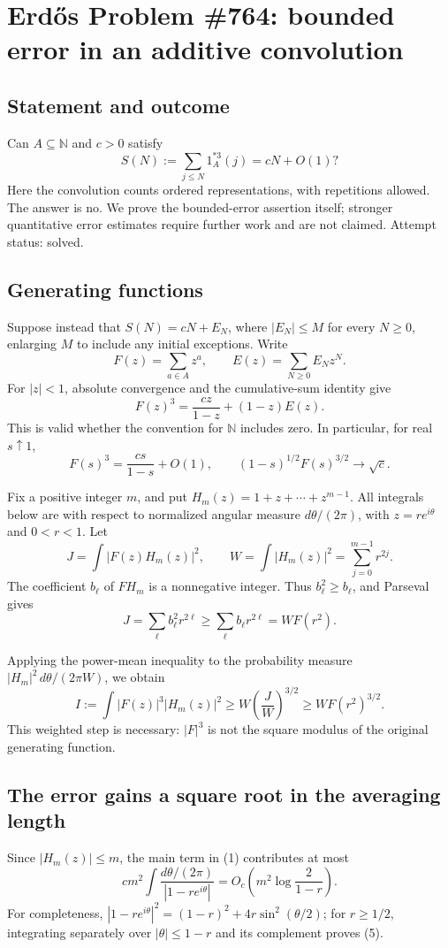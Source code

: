 \section*{Erd\H{o}s Problem \#764: bounded error in an additive convolution}
\subsection*{Statement and outcome}
Can \(A\subseteq\mathbb N\) and \(c>0\) satisfy
\[
S(N):=\sum_{j\leq N}1_A^{*3}(j)=cN+O(1)?
\]
Here the convolution counts ordered representations, with repetitions allowed. The answer is no. We prove the bounded-error assertion itself; stronger quantitative error estimates require further work and are not claimed. Attempt status: solved.

\subsection*{Generating functions}
Suppose instead that \(S(N)=cN+E_N\), where \(|E_N|\leq M\) for every \(N\geq0\), enlarging \(M\) to include any initial exceptions. Write
\[
F(z)=\sum_{a\in A}z^a,\qquad E(z)=\sum_{N\geq0}E_Nz^N.
\]
For \(|z|<1\), absolute convergence and the cumulative-sum identity give
\[
F(z)^3=\frac{cz}{1-z}+(1-z)E(z). \tag{1}
\]
This is valid whether the convention for \(\mathbb N\) includes zero. In particular, for real \(s\uparrow1\),
\[
F(s)^3=\frac{cs}{1-s}+O(1),\qquad
(1-s)^{1/2}F(s)^{3/2}\longrightarrow\sqrt c. \tag{2}
\]

Fix a positive integer \(m\), and put \(H_m(z)=1+z+\cdots+z^{m-1}\). All integrals below are with respect to normalized angular measure \(d\theta/(2\pi)\), with \(z=re^{i\theta}\) and \(0<r<1\). Let
\[
J=\int |F(z)H_m(z)|^2,\qquad W=\int|H_m(z)|^2=\sum_{j=0}^{m-1}r^{2j}.
\]
The coefficient \(b_\ell\) of \(F H_m\) is a nonnegative integer. Thus \(b_\ell^2\geq b_\ell\), and Parseval gives
\[
J=\sum_\ell b_\ell^2r^{2\ell}
 \geq\sum_\ell b_\ell r^{2\ell}=W F(r^2). \tag{3}
\]

Applying the power-mean inequality to the probability measure \(|H_m|^2\,d\theta/(2\pi W)\), we obtain
\[
I:=\int|F(z)|^3|H_m(z)|^2
 \geq W\left(\frac JW\right)^{3/2}
 \geq W F(r^2)^{3/2}. \tag{4}
\]
This weighted step is necessary: \(|F|^3\) is not the square modulus of the original generating function.

\subsection*{The error gains a square root in the averaging length}
Since \(|H_m(z)|\leq m\), the main term in (1) contributes at most
\[
cm^2\int\frac{d\theta/(2\pi)}{|1-re^{i\theta}|}
=O_c\left(m^2\log\frac{2}{1-r}\right). \tag{5}
\]
For completeness, \(|1-re^{i\theta}|^2=(1-r)^2+4r\sin^2(\theta/2)\); for \(r\geq1/2\), integrating separately over \(|\theta|\leq1-r\) and its complement proves (5).

